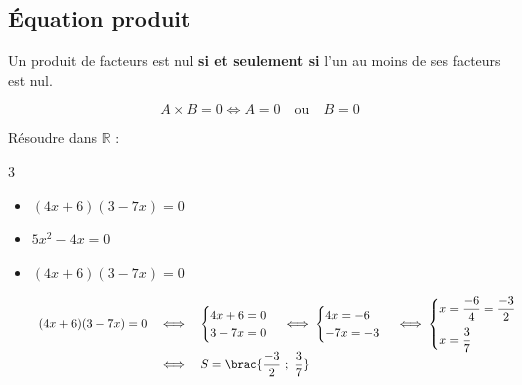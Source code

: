 \subsection{Équation produit}

\begin{prop}
	Un produit de facteurs est nul \textbf{si et seulement si} l'un au moins de ses facteurs est nul.

	\[
		A \times B = 0 \iff A = 0 \quad \text{ou} \quad B = 0
	\]
\end{prop}

\begin{methode}
	Résoudre dans $\mathbb{R}$ :
	\begin{multicols}{3}
		\begin{itemize}
			\item $(4x + 6)(3 - 7x) = 0$
			\item $5x^2 - 4x = 0$
		\end{itemize}
	\end{multicols}

	\begin{correction}
		\nline
		\begin{itemize}
			\item $(4x + 6)(3 - 7x) = 0$

			      \[
				      \begin{array}{rcl}
					      (4x + 6)(3 - 7x) = 0 & \iff & \begin{cases}
						                                    4x + 6 = 0 \\
						                                    3 - 7x = 0
					                                    \end{cases} \iff \begin{cases}
						                                                     4x = -6 \\
						                                                     -7x = -3
					                                                     \end{cases} \iff \begin{cases}
						                                                                      x = \dfrac{-6}{4} = \dfrac{-3}{2} \\[3mm]
						                                                                      x = \dfrac{3}{7}
					                                                                      \end{cases} \\ %
					                           & \iff & S = \brac{\dfrac{-3}{2}\ ;\ \dfrac{3}{7}}
				      \end{array}
			      \]


\end{itemize}
\end{correction}
\end{methode}
